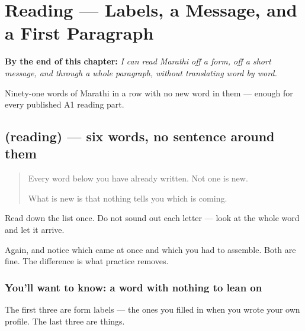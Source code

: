 
\chapter{Reading — Labels, a Message, and a First Paragraph}
\label{ch:mr-pahila-paath}

\begin{chapteropening}
\textbf{By the end of this chapter:} \emph{I can read Marathi off a form, off a short message, and through a whole paragraph, without translating word by word.}

Ninety-one words of Marathi in a row with no new word in them — enough for every published A1 reading part.
\end{chapteropening}

\section[(reading)]{(reading) — six words, no sentence around them}

\label{lesson:MR-C62-labels}



\begin{quote}
Every word below you have already written. Not one is new.

What is new is that nothing tells you which is coming.
\end{quote}

\begin{tcolorbox}[breakable,skin=enhanced,colback=orange!6,colframe=orange!45!black,boxrule=0.5pt,arc=1mm,left=6pt,right=6pt,top=4pt,bottom=4pt,fonttitle=\bfseries,title={Read this}]
\begin{quote}
     
\end{quote}

Read down the list once. Do not sound out each letter — look at the whole word and let it arrive.

Again, and notice which came at once and which you had to assemble. Both are fine. The difference is what practice removes.
\end{tcolorbox}

\subsection*{You'll want to know: a word with nothing to lean on}
The first three are form labels — the ones you filled in when you wrote your own profile. The last three are things.

